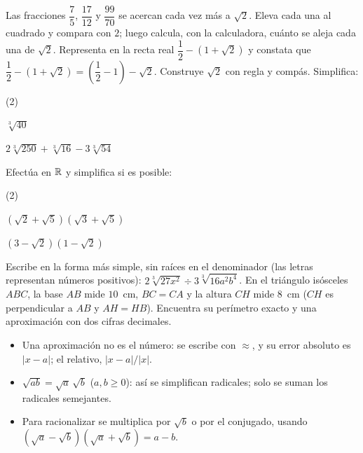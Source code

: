 \documentclass[11pt]{article}
\begin{document}
\begin{preguntas}
\pregunta Las fracciones $\dfrac{7}{5}$, $\dfrac{17}{12}$ y $\dfrac{99}{70}$
se acercan cada vez más a $\sqrt{2}$. Eleva cada una al cuadrado y compara
con $2$; luego calcula, con la calculadora, cuánto se aleja cada una de
$\sqrt{2}$.
\espacio{3.5cm}
\pregunta Representa en la recta real $\dfrac{1}{2} - (1 + \sqrt{2})$ y
constata que $\dfrac{1}{2} - (1 + \sqrt{2}) = \left(\dfrac{1}{2} - 1\right) - \sqrt{2}$.
Construye $\sqrt{2}$ con regla y compás.
\espacio{3cm}
\pregunta Simplifica:
\begin{opciones*}(2)
  \item $\sqrt[3]{40}$
  \item $2\sqrt[3]{250} + \sqrt[3]{16} - 3\sqrt[3]{54}$
\end{opciones*}
\espacio{2.5cm}
\pregunta Efectúa en $\mathbb{R}$ y simplifica si es posible:
\begin{opciones*}(2)
  \item $\left(\sqrt{2} + \sqrt{5}\right)\left(\sqrt{3} + \sqrt{5}\right)$
  \item $\left(3 - \sqrt{2}\right)\left(1 - \sqrt{2}\right)$
\end{opciones*}
\espacio{2.5cm}
\pregunta Escribe en la forma más simple, sin raíces en el denominador (las
letras representan números positivos): $2\sqrt[3]{27x^2} \div 3\sqrt[3]{16a^2b^4}$.
\espacio{3cm}
\pregunta En el triángulo isósceles $ABC$, la base $AB$ mide $10$~cm,
$BC = CA$ y la altura $CH$ mide $8$~cm ($CH$ es perpendicular a $AB$ y
$AH = HB$). Encuentra su perímetro exacto y una aproximación con dos cifras
decimales.
\espacio{3cm}
\end{preguntas}

\begin{resumen}
\begin{itemize}
  \item Una aproximación no es el número: se escribe con $\approx$, y su
        error absoluto es $|x - a|$; el relativo, $|x - a|/|x|$.
  \item $\sqrt{ab} = \sqrt{a}\,\sqrt{b}$ ($a, b \ge 0$): así se simplifican
        radicales; solo se suman los radicales semejantes.
  \item Para racionalizar se multiplica por $\sqrt{b}$ o por el conjugado,
        usando $(\sqrt{a} - \sqrt{b})(\sqrt{a} + \sqrt{b}) = a - b$.
\end{itemize}
\end{resumen}
\end{document}
